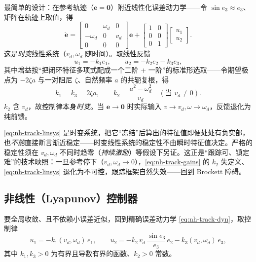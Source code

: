 最简单的设计：在参考轨迹（$\mathbf{e}=\mathbf{0}$）附近线性化误差动力学——令 $\sin e_3\approx e_3$、矩阵在轨迹上取值，得
\begin{equation}
  \dot{\mathbf{e}}=\begin{bmatrix}0&\omega_d&0\\-\omega_d&0&v_d\\0&0&0\end{bmatrix}\mathbf{e}
  +\begin{bmatrix}1&0\\0&0\\0&1\end{bmatrix}\begin{bmatrix}u_1\\u_2\end{bmatrix}.
  \label{eq:nh-track-linsys}
\end{equation}
这是\emph{时变}线性系统（$v_d,\omega_d$ 随时间）。取线性反馈
\begin{equation}
  u_1=-k_1 e_1,\qquad u_2=-k_2 e_2-k_3 e_3,
  \label{eq:nh-track-linfb}
\end{equation}
其中增益按“把闭环特征多项式配成一个二阶 $+$ 一阶”的标准形选取——令期望极点为 $-2\zeta a$ 与一对阻尼 $\zeta$、自然频率 $a$ 的共轭复根，得
\begin{equation}
  k_1=k_3=2\zeta a,\qquad k_2=\frac{a^2-\omega_d^2}{v_d}\quad(\text{当 } v_d\neq0).
  \label{eq:nh-track-gains}
\end{equation}
$k_2$ 含 $v_d$，故控制律本身\emph{时变}。当 $\mathbf{e}\to\mathbf{0}$ 时实际输入 $v\to v_d,\omega\to\omega_d$，反馈退化为纯前馈。

\begin{pitfall}
\cref{eq:nh-track-linsys} 是时变系统，把它“冻结”后算出的特征值即便处处有负实部，也\emph{不能}直接断言渐近稳定——时变线性系统的稳定性不由瞬时特征值决定。严格的稳定性须在 $v_d,\omega_d$ 不同时趋零（\emph{持续激励}）等假设下另证。这正是“跟踪可、镇定难”的技术映照：一旦参考停下（$v_d,\omega_d\to0$），\cref{eq:nh-track-gains} 的 $k_2$ 失定义、\cref{eq:nh-track-linsys} 退化为不可控，跟踪框架自然失效——回到 Brockett 障碍。
\end{pitfall}

\subsection{非线性（Lyapunov）控制器}
\label{sec:nh-track-nl}

要全局收敛、且不依赖小误差近似，回到精确误差动力学 \cref{eq:nh-track-dyn}，取控制律
\begin{equation}
  u_1=-k_1(v_d,\omega_d)\,e_1,\qquad u_2=-k_2\,v_d\,\frac{\sin e_3}{e_3}\,e_2-k_3(v_d,\omega_d)\,e_3,
  \label{eq:nh-track-nlfb}
\end{equation}
其中 $k_1,k_3>0$ 为有界且导数有界的函数、$k_2>0$ 常数。

